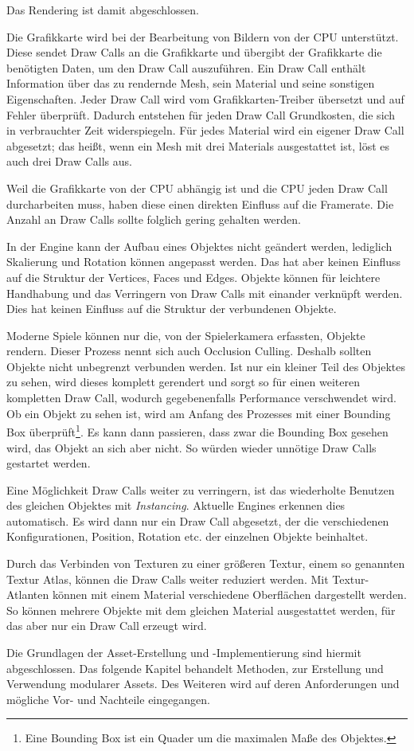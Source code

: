Das Rendering ist damit abgeschlossen.
\par
Die Grafikkarte wird bei der Bearbeitung von Bildern von der CPU unterstützt. Diese sendet Draw Calls an die Grafikkarte und übergibt der Grafikkarte die benötigten Daten, um den Draw Call auszuführen. Ein Draw Call enthält Information über das zu rendernde Mesh, sein Material und seine sonstigen Eigenschaften. Jeder Draw Call wird vom Grafikkarten-Treiber übersetzt und auf Fehler überprüft. Dadurch entstehen für jeden Draw Call Grundkosten, die sich in verbrauchter Zeit widerspiegeln. Für jedes Material wird ein eigener Draw Call abgesetzt; das heißt, wenn ein Mesh mit drei Materials ausgestattet ist, löst es auch drei Draw Calls aus.
\par
Weil die Grafikkarte von der CPU abhängig ist und die CPU jeden Draw Call durcharbeiten muss, haben diese einen direkten Einfluss auf die Framerate. Die Anzahl an Draw Calls sollte folglich gering gehalten werden. \parencite{gpu}
\par
In der Engine kann der Aufbau eines Objektes nicht geändert werden, lediglich Skalierung und Rotation können angepasst werden. Das hat aber keinen Einfluss auf die Struktur der Vertices, Faces und Edges. Objekte können für leichtere Handhabung und das Verringern von Draw Calls mit einander verknüpft werden. Dies hat keinen Einfluss auf die Struktur der verbundenen Objekte.
\par
Moderne Spiele können nur die, von der Spielerkamera erfassten, Objekte rendern. Dieser Prozess nennt sich auch Occlusion Culling. Deshalb sollten Objekte nicht unbegrenzt verbunden werden.  Ist nur ein kleiner Teil des Objektes zu sehen, wird dieses komplett gerendert und sorgt so für einen weiteren kompletten Draw Call, wodurch gegebenenfalls Performance verschwendet wird. Ob ein Objekt zu sehen ist, wird am Anfang des Prozesses mit einer Bounding Box überprüft\footnote{Eine Bounding Box ist ein Quader um die maximalen Maße des Objektes.}. Es kann dann passieren, dass zwar die Bounding Box gesehen wird, das Objekt an sich aber nicht. So würden wieder unnötige Draw Calls gestartet werden. \parencite{gpu}
\par
Eine Möglichkeit Draw Calls weiter zu verringern, ist das wiederholte Benutzen des gleichen Objektes mit \textit{Instancing}. Aktuelle Engines erkennen dies automatisch. Es wird dann nur ein Draw Call abgesetzt, der die verschiedenen Konfigurationen, Position, Rotation etc. der einzelnen Objekte beinhaltet. \parencite{gpu}
\par
Durch das Verbinden von Texturen zu einer größeren Textur, einem so genannten Textur Atlas, können die Draw Calls weiter reduziert werden. Mit Textur-Atlanten können mit einem Material verschiedene Oberflächen dargestellt werden. So können mehrere Objekte mit dem gleichen Material ausgestattet werden, für das aber nur ein Draw Call erzeugt wird. \parencite{gpu} 
\par
Die Grundlagen der Asset-Erstellung und -Implementierung sind hiermit abgeschlossen. Das folgende Kapitel behandelt Methoden, zur Erstellung und Verwendung modularer Assets. Des Weiteren wird auf deren Anforderungen und mögliche Vor- und Nachteile eingegangen. 